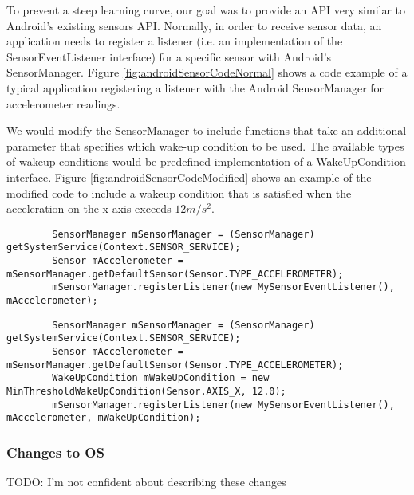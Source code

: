 To prevent a steep learning curve, our goal was to provide an API very similar to Android's existing sensors API. Normally, in order to receive sensor data, an application needs to register a listener (i.e. an implementation of the SensorEventListener interface) for a specific sensor with Android's SensorManager. Figure \ref{fig:androidSensorCodeNormal} shows a code example of a typical application registering a listener with the Android SensorManager for accelerometer readings.

We would modify the SensorManager to include functions that take an additional parameter that specifies which wake-up condition to be used. The available types of wakeup conditions would be predefined implementation of a WakeUpCondition interface. Figure \ref{fig:androidSensorCodeModified} shows an example of the modified code to include a wakeup condition that is satisfied when the acceleration on the x-axis exceeds $12 m/s^2$.

\begin{figure*}[t]
	\begin{verbatim}
		SensorManager mSensorManager = (SensorManager) getSystemService(Context.SENSOR_SERVICE);
		Sensor mAccelerometer = mSensorManager.getDefaultSensor(Sensor.TYPE_ACCELEROMETER);
		mSensorManager.registerListener(new MySensorEventListener(), mAccelerometer);
	\end{verbatim}
	\caption{Typical usage of Android's SensorManager}
    \label{fig:androidSensorCodeNormal}
\end{figure*}

\begin{figure*}[t]
	\begin{verbatim}
		SensorManager mSensorManager = (SensorManager) getSystemService(Context.SENSOR_SERVICE);
		Sensor mAccelerometer = mSensorManager.getDefaultSensor(Sensor.TYPE_ACCELEROMETER);
		WakeUpCondition mWakeUpCondition = new MinThresholdWakeUpCondition(Sensor.AXIS_X, 12.0);
		mSensorManager.registerListener(new MySensorEventListener(), mAccelerometer, mWakeUpCondition);
	\end{verbatim}
	\caption{Usage of the SensorManager with a wakeup condition}
    \label{fig:androidSensorCodeModified}
\end{figure*}

\subsubsection{Changes to OS}

TODO: I'm not confident about describing these changes

